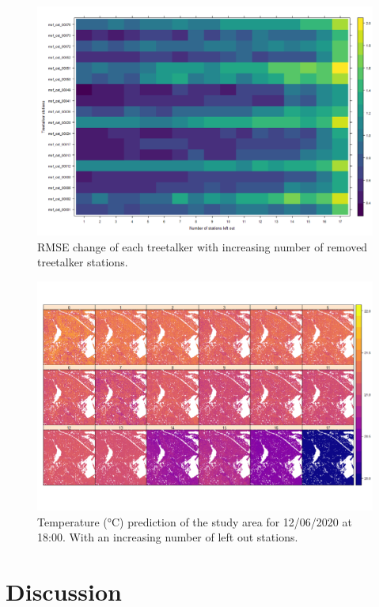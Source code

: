 \documentclass[5p]{elsarticle} %
\begin{document}
\begin{figure}[h]
\begin{center}
\includegraphics[scale=0.5]{heatmap_treetalker_rmse}
\caption{RMSE change of each treetalker with increasing number of removed treetalker stations.}
\end{center}
\end{figure}

\begin{figure}[t]
\begin{center}
\includegraphics[scale=0.5]{full_prediction_study_area}
\caption{Temperature (°C) prediction of the study area for 12/06/2020 at 18:00. With an increasing number of left out stations.}
\end{center}
\end{figure}

\hypertarget{discussion}{%
\section{Discussion}\label{discussion}}
\end{document}
